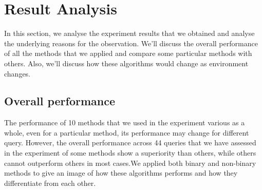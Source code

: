 \chapter{Result Analysis}
In this section, we analyse the experiment results that we obtained and analyse the underlying reasons for the observation. We'll discuss the overall performance of all the methods that we applied and compare some particular methods with others. Also, we'll discuss how these algorithms would change as environment changes.
\section{Overall performance}
The performance of 10 methods that we used in the experiment various as a whole, even for a particular method, its performance may change for different query. However, the overall performance across 44 queries that we have assessed in the experiment of some methods show a superiority than others, while others cannot outperform others in most cases.We applied both binary and non-binary methods to give an image of how these algorithms performs and how they differentiate from each other. 


